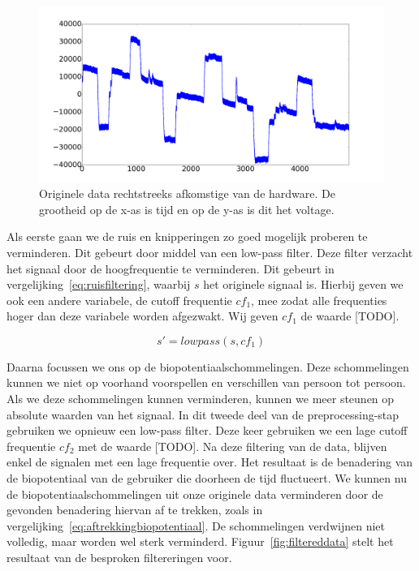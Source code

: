 \documentclass{article}
\begin{document}
\begin{figure}[h]
\centering
\includegraphics[width=\linewidth]{images/original_data}
\caption{Originele data rechtstreeks afkomstige van de hardware. De grootheid op de x-as is tijd en op de y-as is dit het voltage.}
\label{fig:originaldata}
\end{figure}

Als eerste gaan we de ruis en knipperingen zo goed mogelijk proberen te verminderen. Dit gebeurt door middel van een low-pass filter. Deze filter verzacht het signaal door de hoogfrequentie te verminderen. Dit gebeurt in vergelijking~\ref{eq:ruisfiltering}, waarbij $s$ het originele signaal is. Hierbij geven we ook een andere variabele, de cutoff frequentie $cf_1$, mee zodat alle frequenties hoger dan deze variabele worden afgezwakt. Wij geven $cf_1$ de waarde [TODO].

\begin{equation}
\label{eq:ruisfiltering}
s' = lowpass(s, cf_1)
\end{equation}

Daarna focussen we ons op de biopotentiaalschommelingen. Deze schommelingen kunnen we niet op voorhand voorspellen en verschillen van persoon tot persoon. Als we deze schommelingen kunnen verminderen, kunnen we meer steunen op absolute waarden van het signaal. In dit tweede deel van de preprocessing-stap gebruiken we opnieuw een low-pass filter. Deze keer gebruiken we een lage cutoff frequentie $cf_2$ met de waarde [TODO]. Na deze filtering van de data, blijven enkel de signalen met een lage frequentie over. Het resultaat is de benadering van de biopotentiaal van de gebruiker die doorheen de tijd fluctueert. We kunnen nu de biopotentiaalschommelingen uit onze originele data verminderen door de gevonden benadering hiervan af te trekken, zoals in vergelijking~\ref{eq:aftrekkingbiopotentiaal}. De schommelingen verdwijnen niet volledig, maar worden wel sterk verminderd. Figuur~\ref{fig:filtereddata} stelt het resultaat van de besproken filtereringen voor.
\end{document}
